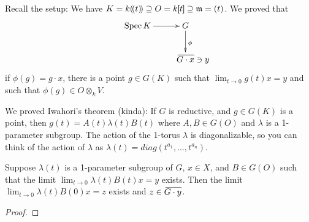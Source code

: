 
Recall the setup: We have $K=k(\!(t)\!)\supseteq O=k[\!\![t]\!\!]\supseteq \mathfrak{m}=(t)$. We proved that
\[\xymatrix{
 \spec K \ar[r] & G\ar[d]^\phi\\
 & \bbar{G\cdot x}\rlap{$\;\ni y$}
}\]
if $\phi(g)=g\cdot x$, there is a point $g\in G(K)$ such that $\lim_{t\to 0} g(t)x=y$ and such that $\phi(g)\in O\otimes_k V$.

We proved Iwahori's theorem (kinda): If $G$ is reductive, and $g\in G(K)$ is a point, then $g(t)=A(t)\lambda(t)B(t)$ where $A,B\in G(O)$ and $\lambda$ is a 1-parameter subgroup. The action of the 1-torus $\lambda$ is diagonalizable, so you can think of the action of $\lambda$ as $\lambda(t)=diag(t^{a_1},\dots, t^{a_n})$.

\begin{lemma}
 Suppose $\lambda(t)$ is a 1-parameter subgroup of $G$, $x\in X$, and $B\in G(O)$ such that the limit $\lim_{t\to 0}\lambda(t)B(t)x=y$ exists. Then the limit $\lim_{t\to 0}\lambda(t)B(0)x=z$ exists and $z\in \bbar{G\cdot y}$.
\end{lemma}
\begin{proof}
 
\end{proof}


